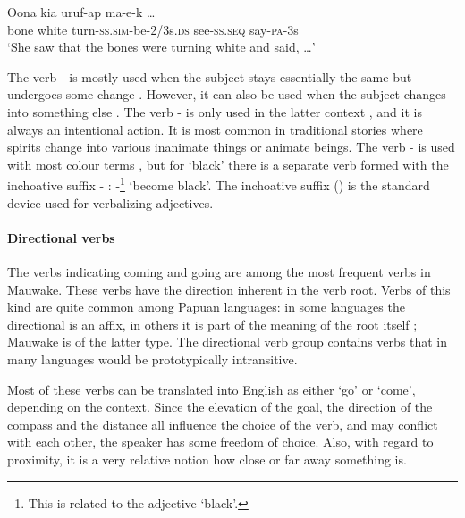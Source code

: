 \ea%
\label{ex:3:x279}
\gll Oona kia  uruf-ap ma-e-k {\dots} \\
bone white turn-\textsc{ss}.\textsc{sim}-be-2/3s.\textsc{ds} see-\textsc{ss}.\textsc{seq} say-\textsc{pa}-3s \\
\glt`She saw that the bones were turning white and said, {\dots}'
\z

The verb - is mostly used when the subject stays essentially the same but undergoes some change . However, it can also be used when the subject changes into something else . The verb - is only used in the latter context , and it is always an intentional action. It is most common in traditional stories where spirits change into various inanimate things or animate beings. The verb - is used with most colour terms , but for `black' there is a separate verb formed with the inchoative suffix \nobreakdash- : -\footnote{This is related to the adjective  `black'.} `become black'. The inchoative suffix () is the standard device used for verbalizing adjectives. 

\paragraph{Directional verbs}\label{sec:3.8.4.4.5}
{}
The verbs indicating coming and going are among the most frequent verbs in Mauwake. These verbs have the direction inherent in the verb root. Verbs of this kind are quite common among Papuan languages: in some languages the directional is an affix, in others it is part of the meaning of the root itself \citep[149]{Foley1986}; Mauwake is of the latter type. The directional verb group contains verbs that in many languages would be prototypically intransitive.

Most of these verbs can be translated into English as either `go' or `come', depending on the context. Since the elevation of the goal, the direction of the compass and the distance all influence the choice of the verb, and may conflict with each other, the speaker has some freedom of choice. Also, with regard to proximity, it is a very relative notion how close or far away something is.

